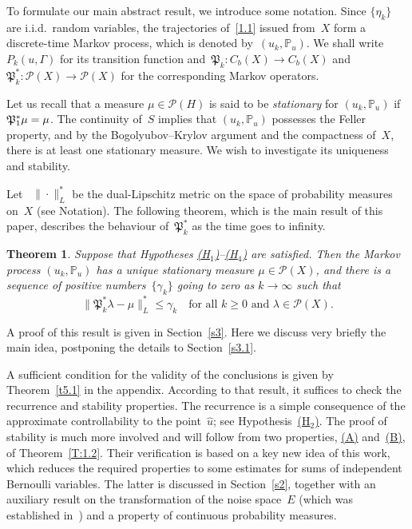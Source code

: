 \documentclass[11pt]{article}
\theoremstyle{plain}
\newtheorem{theorem}{Theorem}[section]
\theoremstyle{definition}
\let\mathcal\mathscr
\theoremstyle{plain}
\numberwithin{equation}{section}
\newcommand{\IP}{{\mathbb P}}
\newcommand{\PP}{{\mathcal P}}
\newcommand{\PPPP}{{\mathfrak P}}
\begin{document}
To formulate our main abstract result, we introduce some notation. Since $\{\eta_k\}$ are i.i.d.\ random variables, the trajectories of~\eqref{1.1} issued from~$X$ form a discrete-time Markov process, which is denoted by~$(u_k,\IP_u)$. We shall write $P_k(u,\Gamma)$ for its transition function and~$\PPPP_k:C_b(X)\to C_b(X)$ and $\PPPP_k^*:\PP(X)\to\PP(X)$ for the corresponding Markov operators.

Let us recall that a measure $\mu \in \PP(H)$ is said to be \emph{stationary} for $(u_k,\IP_u)$ if~$\PPPP^*_1\mu=\nobreak\mu$. The continuity of~$S$ implies that $(u_k,\IP_u)$ possesses the Feller property, and by the Bogolyubov--Krylov argument and the compactness of~$X$, there is at least one stationary measure. We wish to investigate its uniqueness and stability.

Let ~$\|\cdot\|_L^*$ be the dual-Lipschitz metric on the space of probability measures on~$X$ (see Notation). The following theorem, which is the main result of this paper, describes the behaviour of~$\PPPP_k^*$ as the time goes to infinity.

\begin{theorem} \label{t1.1}
Suppose that Hypotheses \hyperlink{H1}{\rm(H$_1$)}--\hyperlink{H4}{\rm(H$_4$)} are satisfied. Then the Markov process $(u_k,\IP_u)$ has a unique stationary measure $\mu\in \PP(X)$, and there is a sequence of positive numbers~$\{\gamma_k\}$ going to zero as $k\to\infty$ such that
\begin{equation} \label{1.6}
\|\PPPP_k^*\lambda-\mu\|_L^*\le \gamma_k\quad\text{for all $k\ge0$ and $\lambda\in\PP(X)$}.
\end{equation}
\end{theorem}
A proof of this result is given in Section~\ref{s3}. Here we discuss very briefly the main idea, postponing the details to Section~\ref{s3.1}.

A sufficient condition for the validity of the conclusions is given by Theorem~\ref{t5.1} in the appendix. According to that result, it suffices to check the recurrence and stability properties. The recurrence is a simple consequence of the approximate controllability to the point~$\hat u$; see Hypothesis~\hyperlink{H2}{(H$_2$)}. The proof of stability is much more involved and will follow from two properties, \hyperlink{(A)}{(A)} and~\hyperlink{(B)}{(B)}, of Theorem~\ref{T:1.2}. Their verification is based on a key new idea of this work, which reduces the required properties to some estimates for sums of independent Bernoulli variables. The latter is discussed in Section~\ref{s2}, together with an auxiliary result on the transformation of the noise space~$E$ (which was established in~\cite{KNS-2020}) and a property of continuous probability measures.
\end{document}
